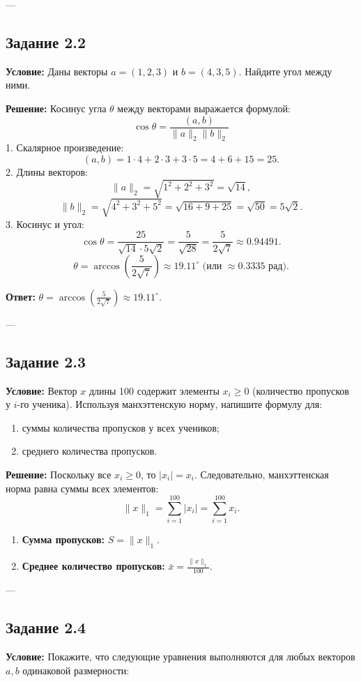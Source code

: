 \documentclass[11pt, a4paper]{article}
\begin{document}
---

\subsection*{Задание 2.2}
\textbf{Условие:} Даны векторы $a=(1,2,3)$ и $b=(4,3,5)$. Найдите угол между ними.

\textbf{Решение:}
Косинус угла $\theta$ между векторами выражается формулой:
$$ \cos \theta = \frac{(a, b)}{\|a\|_2 \|b\|_2} $$
1. Скалярное произведение:
$$ (a, b) = 1 \cdot 4 + 2 \cdot 3 + 3 \cdot 5 = 4 + 6 + 15 = 25. $$
2. Длины векторов:
$$ \|a\|_2 = \sqrt{1^2 + 2^2 + 3^2} = \sqrt{14}, $$
$$ \|b\|_2 = \sqrt{4^2 + 3^2 + 5^2} = \sqrt{16 + 9 + 25} = \sqrt{50} = 5\sqrt{2}. $$
3. Косинус и угол:
$$ \cos \theta = \frac{25}{\sqrt{14} \cdot 5\sqrt{2}} = \frac{5}{\sqrt{28}} = \frac{5}{2\sqrt{7}} \approx 0.94491. $$
$$ \theta = \arccos\left(\frac{5}{2\sqrt{7}}\right) \approx 19.11^\circ \text{ (или } \approx 0.3335 \text{ рад)}. $$

\textbf{Ответ:} $\theta = \arccos\left(\frac{5}{2\sqrt{7}}\right) \approx 19.11^\circ$.

---

\subsection*{Задание 2.3}
\textbf{Условие:} Вектор $x$ длины 100 содержит элементы $x_i \ge 0$ (количество пропусков у $i$-го ученика). Используя манхэттенскую норму, напишите формулу для:
\begin{enumerate}[label=\alph*.]
\item суммы количества пропусков у всех учеников;
\item среднего количества пропусков.
\end{enumerate}

\textbf{Решение:}
Поскольку все $x_i \ge 0$, то $|x_i| = x_i$. Следовательно, манхэттенская норма равна суммы всех элементов:
$$ \|x\|_1 = \sum_{i=1}^{100} |x_i| = \sum_{i=1}^{100} x_i. $$
\begin{enumerate}[label=\alph*.]
\item \textbf{Сумма пропусков:} $S = \|x\|_1$.
\item \textbf{Среднее количество пропусков:} $\bar{x} = \frac{\|x\|_1}{100}$.
\end{enumerate}

---

\subsection*{Задание 2.4}
\textbf{Условие:} Покажите, что следующие уравнения выполняются для любых векторов $a, b$ одинаковой размерности:
\end{document}
